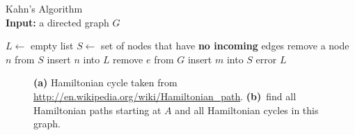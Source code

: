 \documentclass[a4paper]{article}
\begin{document}
\begin{algorithm}
  \caption{
    Kahn's Algorithm\\
    \textbf{Input:} a directed graph $G$
  }\label{algo:kahn}
  \begin{algorithmic}
    \STATE $L \leftarrow$ empty list 
    \STATE $S \leftarrow$ set of nodes that have \textbf{no incoming} edges
      \STATE remove a node $n$ from $S$
      \STATE insert $n$ into $L$
        \STATE remove $e$ from $G$
          \STATE insert $m$ into $S$
        \ENDIF
      \ENDFOR
    \ENDWHILE
      \RETURN error 
    \ENDIF
    \RETURN $L$
  \end{algorithmic}
\end{algorithm}

\begin{figure}[H]
  \centering
  \hspace{5mm}
  \caption{
    \textbf{(a)} Hamiltonian cycle taken from \url{http://en.wikipedia.org/wiki/Hamiltonian\_path}.
    \textbf{(b)}~find all Hamiltonian paths starting at $A$ and all Hamiltonian cycles in this graph.
  }
\end{figure}
\end{document}
